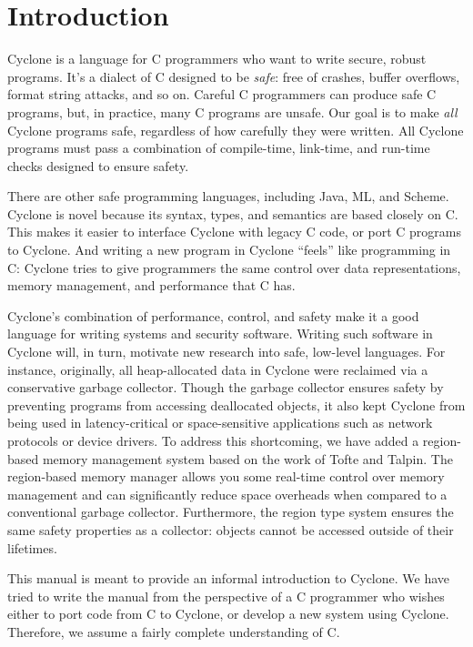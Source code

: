 \section{Introduction}

Cyclone is a language for C programmers who want to write secure,
robust programs.  It's a dialect of C designed to be \emph{safe}: free
of crashes, buffer overflows, format string attacks, and so on.
Careful C programmers can produce safe C programs, but, in practice,
many C programs are unsafe.  Our goal is to make \emph{all} Cyclone
programs safe, regardless of how carefully they were written.  All
Cyclone programs must pass a combination of compile-time, link-time,
and run-time checks designed to ensure safety.

There are other safe programming languages, including Java, ML, and
Scheme.  Cyclone is novel because its syntax, types, and semantics are
based closely on C\@.  This makes it easier to interface Cyclone with
legacy C code, or port C programs to Cyclone.  And writing a new
program in Cyclone ``feels'' like programming in C: Cyclone tries to
give programmers the same control over data representations, memory
management, and performance that C has.

Cyclone's combination of performance, control, and safety make it a
good language for writing systems and security software.  Writing such
software in Cyclone will, in turn, motivate new research into safe,
low-level languages.  For instance, originally, all heap-allocated
data in Cyclone were reclaimed via a conservative garbage collector.
Though the garbage collector ensures safety by preventing programs
from accessing deallocated objects, it also kept Cyclone from being
used in latency-critical or space-sensitive applications such as
network protocols or device drivers.  To address this shortcoming, we
have added a region-based memory management system based on the work
of Tofte and Talpin.  The region-based memory manager allows you some
real-time control over memory management and can significantly reduce
space overheads when compared to a conventional garbage collector.
Furthermore, the region type system ensures the same safety properties
as a collector: objects cannot be accessed outside of their lifetimes.

This manual is meant to provide an informal introduction to Cyclone.
We have tried to write the manual from the perspective of a C 
programmer who wishes either to port code from C to Cyclone, or
develop a new system using Cyclone.  Therefore, we assume a fairly
complete understanding of C.

